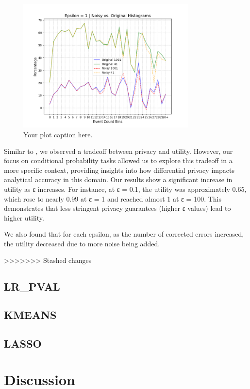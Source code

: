 \documentclass[12pt,letterpaper]{article}
\begin{document}
\begin{table}[h]
\begin{figure}[h!]
    \centering
    \includegraphics[width=0.8\textwidth]{report/figure/histoeps1.png}
    \caption{Your plot caption here.}
    \label{fig:yourplot}
\end{figure}

Similar to , we observed a tradeoff between privacy and utility. However, our focus on conditional probability tasks allowed us to explore this tradeoff in a more specific context, providing insights into how differential privacy impacts analytical accuracy in this domain.
Our results show a significant increase in utility as ε increases. For instance, at ε = 0.1, the utility was approximately 0.65, which rose to nearly 0.99 at ε = 1 and reached almost 1 at ε = 100. This demonstrates that less stringent privacy guarantees (higher ε values) lead to higher utility.

We also found that for each epsilon, as the number of corrected errors increased, the utility decreased due to more noise being added. 

>>>>>>> Stashed changes
\subsection{LR\_PVAL}
\subsection{KMEANS}
\subsection{LASSO}



\section{Discussion}



\end{table}
\end{document}
